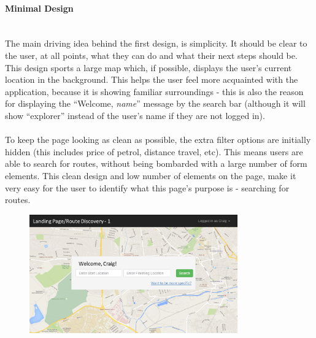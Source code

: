\paragraph{Minimal Design}\ \\
The main driving idea behind the first design, is simplicity. It should be clear to the user, at all points, what they can do and what their next steps should be. This design sports a large map which, if possible, displays the user's current location in the background. This helps the user feel more acquainted with the application, because it is showing familiar surroundings - this is also the reason for displaying the ``Welcome, \textit{name}'' message by the search bar (although it will show ``explorer'' instead of the user's name if they are not logged in).\ \\
\ \\
To keep the page looking as clean as possible, the extra filter options are initially hidden (this includes price of petrol, distance travel, etc). This means users are able to search for routes, without being bombarded with a large number of form elements. This clean design and low number of elements on the page, make it very easy for the user to identify what this page's purpose is - searching for routes.
\begin{figure}[!ht]
\vspace{6mm}
 \begin{center}
		\includegraphics[width=0.8\textwidth]{images/ui-landing-1.png}
	\end{center}
	\vspace{-6mm}
\end{figure}\ \\

\newpage 
